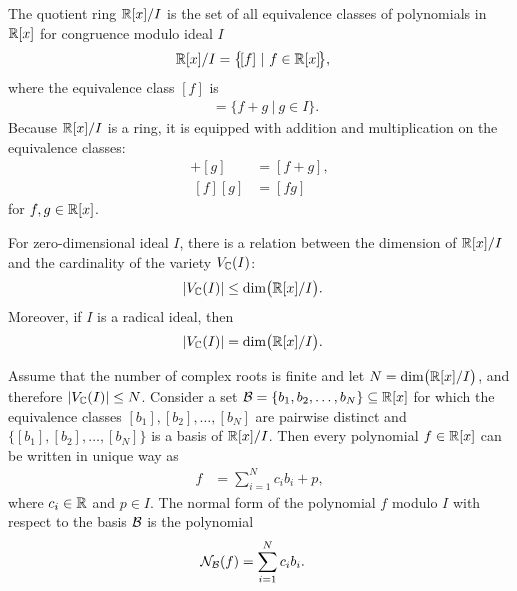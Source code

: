 The quotient ring $\mathbb{R}[x]/I$ is the set of all equivalence classes of polynomials in $\mathbb{R}[x]$ for congruence modulo ideal $I$
\begin{align}
  \mathbb{R}[x]/I &= \big\{\![f]\ |\ f\in\mathbb{R}[x]\!\big\},
\end{align}
where the equivalence class $[f]$ is
\begin{align}
  [f] &= \big\{f+g\ |\ g\in I\big\}.
\end{align}
Because $\mathbb{R}[x]/I$ is a ring, it is equipped with addition and multiplication on the equivalence classes:
\begin{align}
  [f] + [g] &= [f + g],\\
  ~[f][g] &= [fg]
\end{align}
for $f, g\in\mathbb{R}[x]$.

For zero-dimensional ideal $I$, there is a relation between the dimension of $\mathbb{R}[x]/I$ and the cardinality of the variety $V_{\mathbb{C}}(I)$:
\begin{align}
  |V_{\mathbb{C}}(I)| &\leq \dim\!\big(\mathbb{R}[x]/I\big).
\end{align}
Moreover, if $I$ is a radical ideal, then
\begin{align}
  |V_{\mathbb{C}}(I)| &= \dim\!\big(\mathbb{R}[x]/I\big).
\end{align}

Assume that the number of complex roots is finite and let $N = \dim\!\big(\mathbb{R}[x]/I\big)$, and therefore $|V_{\mathbb{C}}(I)|\leq N$.
Consider a set $\mathcal{B} = \{b_1, b_2, \ldots, b_N\} \subseteq \mathbb{R}[x]$ for which the equivalence classes $[b_1], [b_2], \ldots, [b_N]$ are pairwise distinct and $\big\{\![b_1], [b_2], \ldots, [b_N]\!\big\}$ is a basis of $\mathbb{R}[x]/I$.
Then every polynomial $f\in\mathbb{R}[x]$ can be written in unique way as
\begin{align}
  f &= \sum_{i=1}^Nc_ib_i + p,
\end{align}
where $c_i\in\mathbb{R}$ and $p\in I$.
The normal form of the polynomial $f$ modulo $I$ with respect to the basis $\mathcal{B}$ is the polynomial
\begin{align}
  \mathcal{N}_{\mathcal{B}}(f) &= \sum_{i=1}^N c_ib_i.
\end{align}

